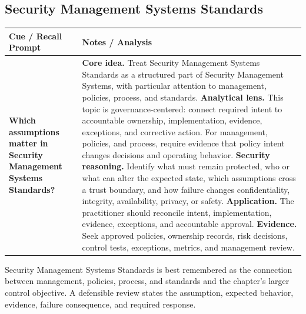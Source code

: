\documentclass[11pt]{article}
\newcommand{\CornellHeader}{%
\rowcolor{Navy}\color{white}\bfseries Cue / Recall Prompt & \color{white}\bfseries Notes / Analysis\\\hline}
\newcommand{\CornellRow}[2]{%
\cellcolor{CueGray}\RaggedRight\textbf{#1} & \RaggedRight #2\\\hline}
\begin{document}
\subsection*{Security Management Systems Standards}
\begin{longtable}{>{\RaggedRight\arraybackslash}p{}|>{\RaggedRight\arraybackslash}p{}}
\CornellHeader
\CornellRow{Which assumptions matter in Security Management Systems Standards?}{\textbf{Core idea.} Treat Security Management Systems Standards as a structured part of Security Management Systems, with particular attention to management, policies, process, and standards. \textbf{Analytical lens.} This topic is governance-centered: connect required intent to accountable ownership, implementation, evidence, exceptions, and corrective action. For management, policies, and process, require evidence that policy intent changes decisions and operating behavior. \textbf{Security reasoning.} Identify what must remain protected, who or what can alter the expected state, which assumptions cross a trust boundary, and how failure changes confidentiality, integrity, availability, privacy, or safety. \textbf{Application.} The practitioner should reconcile intent, implementation, evidence, exceptions, and accountable approval. \textbf{Evidence.} Seek approved policies, ownership records, risk decisions, control tests, exceptions, metrics, and management review.}
\end{longtable}
\begin{topicsummary}
Security Management Systems Standards is best remembered as the connection between management, policies, process, and standards and the chapter's larger control objective. A defensible review states the assumption, expected behavior, evidence, failure consequence, and required response.
\end{topicsummary}
\end{document}
